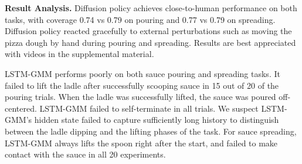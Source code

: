 


\textbf{Result Analysis.}
Diffusion policy achieves close-to-human performance on both tasks, with coverage 0.74 vs 0.79 on pouring and 0.77 vs 0.79 on spreading. 
Diffusion policy reacted gracefully to external perturbations such as moving the pizza dough by hand during pouring and spreading. 
Results are best appreciated with videos in the supplemental material. 

LSTM-GMM performs poorly on both sauce pouring and spreading tasks. It failed to lift the ladle after successfully scooping sauce in 15 out of 20 of the pouring trials. When the ladle was successfully lifted, the sauce was poured off-centered. LSTM-GMM failed to self-terminate in all trials. We suspect LSTM-GMM's hidden state failed to capture sufficiently long history to distinguish between the ladle dipping and the lifting phases of the task. For sauce spreading, LSTM-GMM always lifts the spoon right after the start, and failed to make contact with the sauce in all 20 experiments. 

